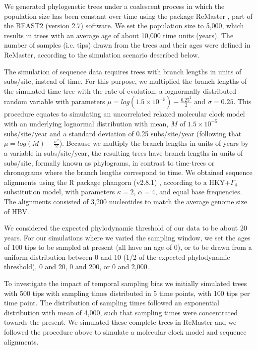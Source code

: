 \documentclass[11pt]{article}
\begin{document}
We generated phylogenetic trees under a coalescent process in which the population size has been constant over time using the package ReMaster \citep{vaughan2024remaster}, part of the BEAST2 (version 2.7) software. We set the population size to 5,000, which results in trees with an average age of about 10,000 time units (years). The number of samples (i.e. tips) drawn from the trees and their ages were defined in ReMaster, according to the simulation scenario described below.

The simulation of sequence data requires trees with branch lengths in units of subs/site, instead of time. For this purpose, we multiplied the branch lengths of the simulated time-tree with the rate of evolution, a lognormally distributed random variable with parameters $\mu=log(1.5\times10^{-5}) - \frac{0.25^2}{2}$ and $\sigma=0.25$. This procedure equates to simulating an uncorrelated relaxed molecular clock model with an underlying lognormal distribution \citep{drummond2006relaxed} with mean, $M$ of $1.5\times10^{-5}$ subs/site/year and a standard deviation of 0.25 subs/site/year (following that $\mu=log(M)-\frac{\sigma^2}{2}$). Because we multiply the branch lengths in units of years by a variable in subs/site/year, the resulting trees have branch lengths in units of subs/site, formally known as phylograms, in contrast to time-trees or chronograms where the branch lengths correspond to time. We obtained sequence alignments using the R package phangorn (v2.8.1) \citep{schliep2011phangorn}, according to a HKY+$\Gamma_4$ substitution model, with parameters $\kappa=2$, $\alpha=4$, and equal base frequencies. The alignments consisted of 3,200 nucleotides to match the average genome size of HBV.

We considered the expected phylodynamic threshold of our data to be about 20 years. For our simulations where we varied the sampling window, we set the ages of 100 tips to be sampled at present (all have an age of 0), or to be drawn from a uniform distribution between 0 and 10 (1/2 of the expected phylodynamic threshold), 0 and 20, 0 and 200, or 0 and 2,000. 

To investigate the impact of temporal sampling bias we initially simulated trees with 500 tips with sampling times distributed in 5 time points, with 100 tips per time point. The distribution of sampling times followed an exponential distribution with mean of 4,000, such that sampling times were concentrated towards the present. We simulated these complete trees in ReMaster and we followed the procedure above to simulate a molecular clock model and sequence alignments. 
\end{document}
